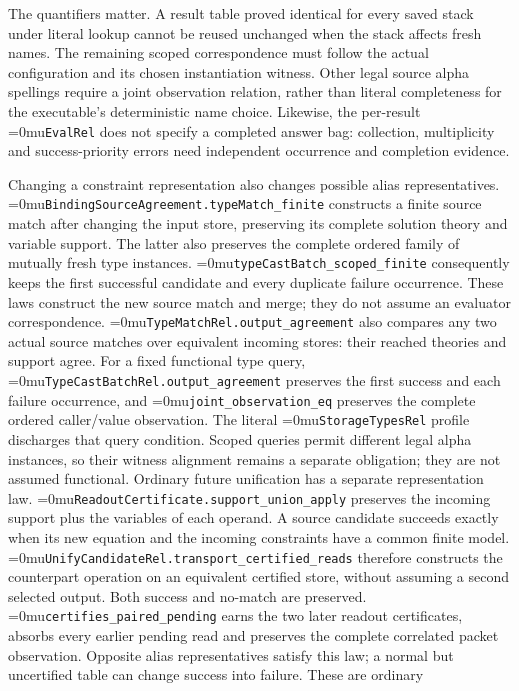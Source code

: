 \documentclass[11pt,a4paper]{article}
\newcommand{\name}[1]{\textup{\Urlmuskip=0mu\relax\nolinkurl{#1}}}
\begin{document}
The quantifiers matter. A result table proved identical for every saved
stack under literal lookup cannot be reused unchanged when the stack affects
fresh names. The remaining scoped correspondence must follow the actual
configuration and its chosen instantiation witness. Other legal source alpha
spellings require a joint observation relation, rather than literal completeness
for the executable's deterministic name choice. Likewise, the per-result
\name{EvalRel} does not specify a completed answer bag: collection, multiplicity
and success-priority errors need independent occurrence and completion evidence.

Changing a constraint representation also changes possible alias
representatives. \name{BindingSourceAgreement.typeMatch_finite} constructs a
finite source match after changing the input store, preserving its complete
solution theory and variable support. The latter also preserves the complete
ordered family of mutually fresh type instances.
\name{typeCastBatch_scoped_finite} consequently keeps the first successful
candidate and every duplicate failure occurrence. These laws construct the
new source match and merge; they do not assume an evaluator correspondence.
\name{TypeMatchRel.output_agreement} also compares any two actual source
matches over equivalent incoming stores: their reached theories and support
agree. For a fixed functional type query,
\name{TypeCastBatchRel.output_agreement} preserves the first success and each
failure occurrence, and \name{joint_observation_eq} preserves the complete
ordered caller/value observation. The literal \name{StorageTypesRel} profile
discharges that query condition. Scoped queries permit different legal alpha
instances, so their witness alignment remains a separate obligation; they
are not assumed functional.
Ordinary future unification has a separate representation law.
\name{ReadoutCertificate.support_union_apply} preserves the incoming support
plus the variables of each operand. A source candidate succeeds exactly when
its new equation and the incoming constraints have a common finite model.
\name{UnifyCandidateRel.transport_certified_reads} therefore constructs the
counterpart operation on an equivalent certified store, without assuming a
second selected output. Both success and no-match are preserved.
\name{certifies_paired_pending} earns the two later readout certificates,
absorbs every earlier pending read and preserves the complete correlated
packet observation. Opposite alias representatives satisfy this law; a normal
but uncertified table can change success into failure. These are ordinary
\end{document}

